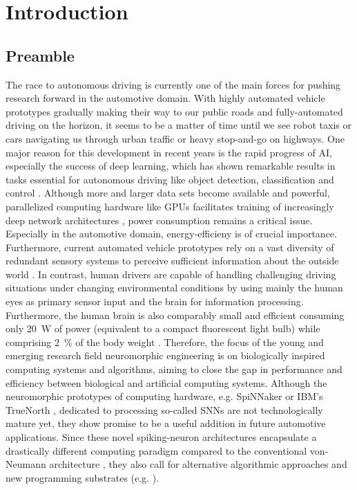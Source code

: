 \chapter{Introduction}
\section{Preamble}
The race to autonomous driving is currently one of the main forces for pushing research forward in the automotive domain.
With highly automated vehicle prototypes gradually making their way to our public roads and fully-automated driving on the horizon, it seems to be a matter of time until we see robot taxis or cars navigating us through urban traffic or heavy stop-and-go on highways.
One major reason for this development in recent years is the rapid progress of \ac{AI}, especially the success of deep learning, which %
has shown remarkable results in tasks essential for autonomous driving like object detection, classification \cite{Ciresan2012} and control \cite{Bojarski2016}.
Although more and larger data sets \cite{Geiger2013a, Cordts2016} become available and powerful, parallelized computing hardware like \acp{GPU} facilitates training of increasingly deep network architectures \cite{Simonyan2014}, power consumption remains a critical issue.
Especially in the automotive domain, energy-efficieny is of crucial importance.
Furthermore, current automated vehicle prototypes rely on a vast diversity of redundant sensory systems to perceive sufficient information about the outside world \cite{Aeberhard2015}.
In contrast, human drivers are capable of handling challenging driving situations under changing environmental conditions by using mainly the human eyes as primary sensor input and the brain for information processing.
Furthermore, the human brain is also comparably small and efficient consuming only \SI{20}{\watt} of power (equivalent to a compact fluorescent light bulb) while comprising \SI{2}{\percent} of the body weight \cite[Chap. 2.1]{Eliasmith2013}.
Therefore, the focus of the young and emerging research field neuromorphic engineering is on biologically inspired computing systems and algorithms, aiming to close the gap in performance and efficiency between biological and artificial computing systems.
Although the neuromorphic prototypes of computing hardware, e.g. \ac{SpiNNaker} \cite{Furber2014} or  IBM's TrueNorth \cite{Akopyan2015}, dedicated to processing so-called \acp{SNN} are not technologically mature yet, they show promise to be a useful addition in future automotive applications.
Since these novel spiking-neuron architectures encapsulate a drastically different computing paradigm compared to the conventional von-Neumann architecture \cite{vonNeumann1993}, they also call for alternative algorithmic approaches and new programming substrates (e.g. \cite{Amir2013}).

